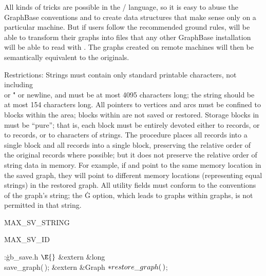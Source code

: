 All kinds of tricks are possible in the \CEE/ language, so it is
easy to abuse the GraphBase conventions and to create data structures that
make sense only on a particular machine. But if users follow the
recommended ground rules,  will be able to transform their
graphs into files that any other GraphBase installation will be able
to read with . The graphs created on remote machines
will
then be semantically equivalent to the originals.

Restrictions: Strings must contain only standard printable characters, not
including \.\\ or \." or newline, and must be at most 4095 characters long;
the  string should be at most 154 characters long. All
pointers to vertices and arcs must be confined to blocks within the
 area; blocks within  are not
saved or restored.
Storage blocks in  must be ``pure''; that is,
each block must be entirely
devoted either to  records, or to  records, or to
characters of strings. The  procedure places all
 records into a single  block and
all  records into a single  block, preserving the
relative order of the original records where possible; but it does not
preserve the relative order of string data in memory. For example, if
 and  point to the same memory
location in the saved
graph, they will point to different memory locations (representing equal
strings) in the restored graph. All utility fields must conform to
the conventions of the graph's  string; the \.G option,
which
leads to graphs within graphs, is not permitted in that string.

\Y\B\4\D\.{MAX\_SV\_STRING}\5
\par
\B\4\D\.{MAX\_SV\_ID}\5
\par
\Y\B\4:\.{gb\_save.h }\X${}\E{}$\6
\&{extern} \&{long} \\{save\_graph}(\,);\6
\&{extern} \&{Graph} ${}{*}\\{restore\_graph}(\,){}$;\par
\fi

